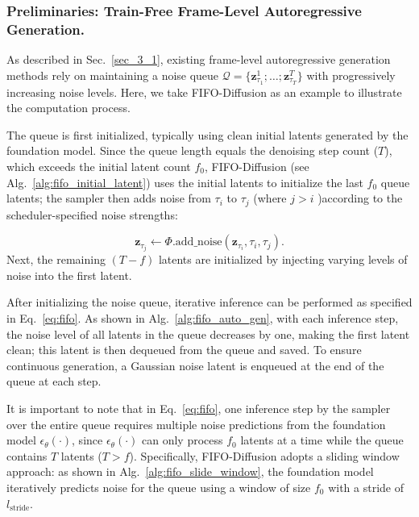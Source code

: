 \documentclass{llmxive}
\begin{document}
\subsubsection{Preliminaries: Train-Free Frame-Level Autoregressive Generation.}
\label{app:pseudocode_initial_fifo}

As described in Sec.~\ref{sec_3_1}, existing frame-level autoregressive generation methods rely on maintaining a noise queue $\mathcal{Q} = \{\mathbf{z}_{\tau_1}^1;\ldots; \mathbf{z}_{\tau_T}^T\}$ with progressively increasing noise levels.
Here, we take FIFO-Diffusion \cite{kim2024fifo} as an example to illustrate the computation process. 


The queue is first initialized, typically using clean initial latents generated by the foundation model. Since the queue length equals the denoising step count ($T$), which exceeds the initial latent count $f_0$, FIFO-Diffusion (see Alg.~\ref{alg:fifo_initial_latent}) uses the initial latents to initialize the last $f_0$ queue latents; the sampler \cite{ho2020denoising,lipman2022flow}  then adds noise from $\tau_{i}$ to $\tau_{j}$ (where $j > i$ )according to the scheduler-specified noise strengths:

\begin{equation}
\mathbf{z}_{\tau_{j}} \gets \Phi.\mathrm{add\_noise}(\mathbf{z}_{\tau_{i}} , \tau_{i},\tau_{j}).
\end{equation}
Next, the remaining $(T-f)$ latents are initialized by injecting varying levels of noise into the first latent.


After initializing the noise queue, iterative inference can be performed as specified in Eq.~\ref{eq:fifo}. As shown in Alg.~\ref{alg:fifo_auto_gen}, with each inference step, the noise level of all latents in the queue decreases by one, making the first latent clean; this latent is then dequeued from the queue and saved. To ensure continuous generation, a Gaussian noise latent is enqueued at the end of the queue at each step.


It is important to note that in Eq.~\ref{eq:fifo}, one inference step by the sampler over the entire queue requires multiple noise predictions from the foundation model $\epsilon_{\theta}(\cdot)$, since $\epsilon_{\theta}(\cdot)$ can only process $f_0$ latents at a time while the queue contains $T$ latents ($T>f$). Specifically, FIFO-Diffusion adopts a sliding window approach: as shown in Alg.~\ref{alg:fifo_slide_window}, the foundation model iteratively predicts noise for the queue using a window of size $f_0$ with a stride of $l_{\mathrm{stride}}$.
\end{document}
